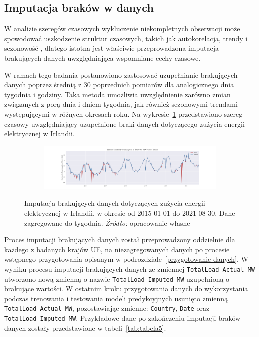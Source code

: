\documentclass[polish, twoside, 12pt, a4paper]{article}
\theoremstyle{definition}
\theoremstyle{plain}
\theoremstyle{remark}
\newcommand{\code}[1]{\lstinline{#1}}
\begin{document}
\subsection{Imputacja braków w danych}

W analizie szeregów czasowych wykluczenie niekompletnych obserwacji może spowodować uszkodzenie struktur czasowych, takich jak autokorelacja, trendy i sezonowość \parencite{box1994}, dlatego istotna jest właściwie przeprowadzona imputacja brakujących danych uwzględniająca wspomniane cechy czasowe. 

W ramach tego badania postanowiono zastosować uzupełnianie brakujących danych poprzez średnią z 30 poprzednich pomiarów dla analogicznego dnia tygodnia i godziny. Taka metoda umożliwia uwzględnienie zarówno zmian związanych z porą dnia i dniem tygodnia, jak również sezonowymi trendami występującymi w różnych okresach roku. Na wykresie~\ref{fig:x12} przedstawiono szereg czasowy uwzględniający uzupełnione braki danych dotyczącego zużycia energii elektrycznej w Irlandii.

\begin{figure}[hbt]
  \centering

  \begin{subfigure}[t]{0.95\textwidth}
    \includegraphics[width=\textwidth]{./out_figures/imputed_electricity_consumption_Ireland.png}
  \end{subfigure}

  \captionsetup{margin=10pt,font=small,labelfont=bf,width=.8\textwidth}

  \caption[Imputacja brakujących danych dotyczących zużycia energii elektrycznej w Irlandii, w okresie od 2015-01-01 do 2021-08-30. Dane zagregowane do tygodnia.]{Imputacja brakujących danych dotyczących zużycia energii elektrycznej w Irlandii, w okresie od 2015-01-01 do 2021-08-30. Dane zagregowane do tygodnia. \textit{Źródło:} opracowanie własne}\label{fig:x12}
\end{figure}

Proces imputacji brakujących danych został przeprowadzony oddzielnie dla każdego z badanych krajów UE, na niezagregowanych danych po procesie wstępnego przygotowania opisanym w podrozdziale~\ref{przygotowanie-danych}. W wyniku procesu imputacji brakujących danych ze zmiennej \code{TotalLoad_Actual_MW} utworzono nową zmienną o nazwie \code{TotalLoad_Imputed_MW} uzupełnioną o brakujące wartości. W ostatnim kroku przygotowania danych do wykorzystania podczas trenowania i testowania modeli predykcyjnych usunięto zmienną \code{TotalLoad_Actual_MW}, pozostawiając zmienne: \code{Country}, \code{Date} oraz \code{TotalLoad_Imputed_MW}. Przykładowe dane po zakończeniu imputacji braków danych zostały przedstawione w tabeli~\ref{tab:tabela5}.
\end{document}
